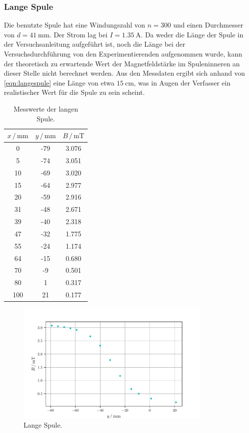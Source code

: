     \subsubsection{Lange Spule}
    Die benutzte Spule hat eine Windungszahl von $n=300$ und einen Durchmesser von $d=\SI{41}{\milli\m}$. 
    Der Strom lag bei $I=\SI{1.35}{\ampere}$. Da weder die Länge der Spule in der Versuchsanleitung aufgeführt ist, noch 
    die Länge bei der Versuchsdurchführung von den Experimentierenden aufgenommen wurde, kann der theoretisch zu erwartende 
    Wert der Magnetfeldstärke im Spuleninneren an dieser Stelle nicht berechnet werden. 
    Aus den Messdaten ergibt sich anhand von \eqref{eqn:langespule} eine Länge von etwa $\SI{15}{\centi\m}$, was in Augen 
    der Verfasser ein realistischer 
    Wert für die Spule zu sein scheint.
    \begin{table}
    \centering
    \caption{Messwerte der langen Spule.}
    \label{tab:langSp}
        \begin{tabular}{S[table-format=3.0] S[table-format=2.0] S[table-format=2.2]}
            \toprule
            {$x\,/\,\mathrm{mm}$} & {$y\,/\,\mathrm{mm}$} & {$B\,/\,\mathrm{mT}$}\\
               & -79   & 3.076 \\
            5   & -74   & 3.051 \\
            10  & -69   & 3.020 \\
            15  & -64   & 2.977 \\
            20  & -59   & 2.916 \\
            31  & -48   & 2.671 \\
            39  & -40   & 2.318 \\
            47  & -32   & 1.775 \\
            55  & -24   & 1.174 \\
            64  & -15   & 0.680 \\
            70  & -9    & 0.501 \\
            80  & 1     & 0.317 \\
            100 & 21    & 0.177 \\
            \bottomrule
        \end{tabular}
    \end{table}
    \begin{figure}
        \centering
        \includegraphics[width=0.85\textwidth]{Plots/plot_langSp.pdf}
        \caption{Lange Spule.}
        \label{fig:lang}
    \end{figure}